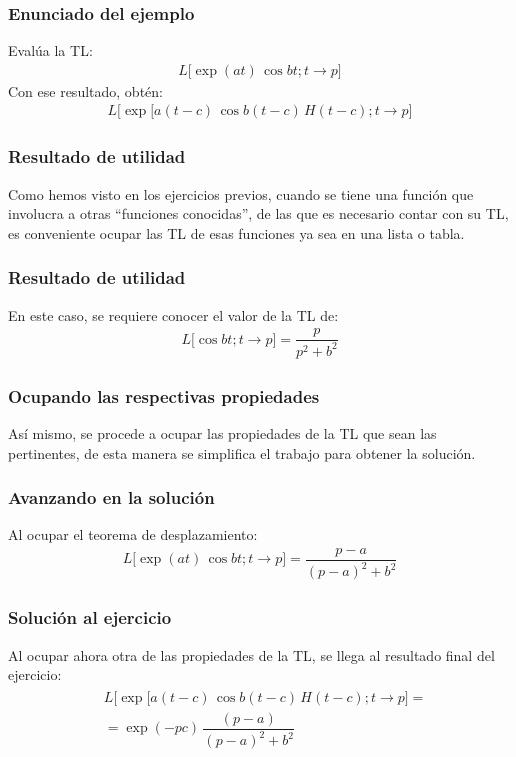 \documentclass[12pt]{beamer}
\begin{document}
\begin{frame}
\frametitle{Enunciado del ejemplo}
Evalúa la TL:
\pause
\begin{align*}
L \big[ \exp (a t) \, \cos bt; t \to p \big]
\end{align*}
\pause
Con ese resultado, obtén:
\pause
\begin{align*}
L \big[ \exp\big[ a(t - c) \, \cos b (t - c) \, H (t - c); t \to p \big]
\end{align*}
\end{frame}
\begin{frame}
\frametitle{Resultado de utilidad}
Como hemos visto en los ejercicios previos, cuando se tiene una función que involucra a otras \enquote{funciones conocidas}, de las que es necesario contar con su TL, \pause es conveniente ocupar las TL de esas funciones ya sea en una lista o tabla.
\end{frame}
\begin{frame}
\frametitle{Resultado de utilidad}
En este caso, se requiere conocer el valor de la TL de:
\pause
\begin{align*}
L \big[ \cos b t; t \to p \big] = \dfrac{p}{p^{2} + b^{2}}
\end{align*}    
\end{frame}
\begin{frame}
\frametitle{Ocupando las respectivas propiedades}
Así mismo, se procede a ocupar las propiedades de la TL que sean las pertinentes, de esta manera se simplifica el trabajo para obtener la solución.
\end{frame}
\begin{frame}
\frametitle{Avanzando en la solución}
Al ocupar el teorema de desplazamiento:
\pause
\begin{align*}
L \big[ \exp(a t) \, \cos b t; t \to p \big] = \dfrac{p - a}{(p - a)^{2} + b^{2}}
\end{align*}
\end{frame}
\begin{frame}
\frametitle{Solución al ejercicio}
Al ocupar ahora otra de las propiedades de la TL, se llega al resultado final del ejercicio:
\pause
\begin{eqnarray*}
\begin{aligned}
&L \big[ \exp\big[ a(t - c) \, \cos b (t - c) \, H (t - c); t \to p \big] = \\[0.5em]
&= \exp (- p c) \, \dfrac{(p - a)}{(p - a)^{2} + b^{2}}
\end{aligned}
\end{eqnarray*}
\end{frame}
\end{document}
